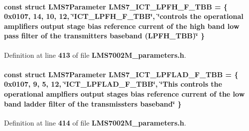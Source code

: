 \paragraph[{L\+M\+S7\+\_\+\+I\+C\+T\+\_\+\+L\+P\+F\+H\+\_\+\+F\+\_\+\+T\+BB}]{\setlength{\rightskip}{0pt plus 5cm}const struct {\bf L\+M\+S7\+Parameter} L\+M\+S7\+\_\+\+I\+C\+T\+\_\+\+L\+P\+F\+H\+\_\+\+F\+\_\+\+T\+BB = \{ 0x0107, 14, 10, 12, \char`\"{}\+I\+C\+T\+\_\+\+L\+P\+F\+H\+\_\+\+F\+\_\+\+T\+B\+B\char`\"{}, \char`\"{}controls the operational amplifiers output stage bias reference current of the high band low pass filter of the transmitter\textquotesingle{}s baseband (\+L\+P\+F\+H\+\_\+\+T\+B\+B)\char`\"{} \}\hspace{0.3cm}{\ttfamily [static]}}\label{LMS7002M__parameters_8h_ade424ab561396abc92eaad72544d90b4}


Definition at line {\bf 413} of file {\bf L\+M\+S7002\+M\+\_\+parameters.\+h}.

\paragraph[{L\+M\+S7\+\_\+\+I\+C\+T\+\_\+\+L\+P\+F\+L\+A\+D\+\_\+\+F\+\_\+\+T\+BB}]{\setlength{\rightskip}{0pt plus 5cm}const struct {\bf L\+M\+S7\+Parameter} L\+M\+S7\+\_\+\+I\+C\+T\+\_\+\+L\+P\+F\+L\+A\+D\+\_\+\+F\+\_\+\+T\+BB = \{ 0x0107, 9, 5, 12, \char`\"{}\+I\+C\+T\+\_\+\+L\+P\+F\+L\+A\+D\+\_\+\+F\+\_\+\+T\+B\+B\char`\"{}, \char`\"{}\+This controls the operational amplfiers\textquotesingle{} output stages bias reference current of the low band ladder filter of the transmisster\textquotesingle{}s baseband\char`\"{} \}\hspace{0.3cm}{\ttfamily [static]}}\label{LMS7002M__parameters_8h_ad714cb98bada639ccf603275ab9b4cc6}


Definition at line {\bf 414} of file {\bf L\+M\+S7002\+M\+\_\+parameters.\+h}.

